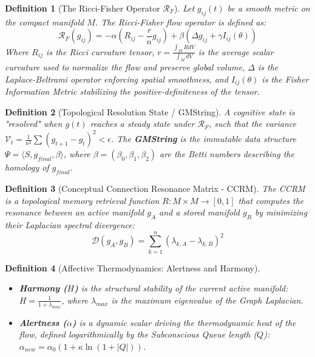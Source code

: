 \documentclass[11pt,a4paper,twocolumn]{article}
\newtheorem{definition}{Definition}[section]
\begin{document}
\begin{definition}[The Ricci-Fisher Operator $\mathcal{R}_F$]
Let $g_{ij}(t)$ be a smooth metric on the compact manifold $M$. The Ricci-Fisher flow operator is defined as:
\[ \mathcal{R}_F(g_{ij}) = -\alpha \left( R_{ij} - \frac{r}{n} g_{ij} \right) + \beta \left( \Delta g_{ij} + \gamma I_{ij}(\theta) \right) \]
Where $R_{ij}$ is the Ricci curvature tensor, $r = \frac{\int_M R dV}{\int_M dV}$ is the average scalar curvature used to normalize the flow and preserve global volume, $\Delta$ is the Laplace-Beltrami operator enforcing spatial smoothness, and $I_{ij}(\theta)$ is the Fisher Information Metric stabilizing the positive-definiteness of the tensor.
\end{definition}

\begin{definition}[Topological Resolution State / GMString]
A cognitive state is "resolved" when $g(t)$ reaches a steady state under $\mathcal{R}_F$, such that the variance $\mathcal{V}_t = \frac{1}{n^2} \sum (g_{t+1} - g_t)^2 < \epsilon$. The \textbf{GMString} is the immutable data structure $\Psi = \langle S, g_{final}, \beta \rangle$, where $\beta = (\beta_0, \beta_1, \beta_2)$ are the Betti numbers describing the homology of $g_{final}$.
\end{definition}

\begin{definition}[Conceptual Connection Resonance Matrix - CCRM]
The CCRM is a topological memory retrieval function $R: M \times M \to [0,1]$ that computes the resonance between an active manifold $g_A$ and a stored manifold $g_B$ by minimizing their Laplacian spectral divergence:
\[ \mathcal{D}(g_A, g_B) = \sum_{k=1}^n (\lambda_{k, A} - \lambda_{k, B})^2 \]
\end{definition}

\begin{definition}[Affective Thermodynamics: Alertness and Harmony]
\begin{itemize}[noitemsep]
    \item \textbf{Harmony ($H$)} is the structural stability of the current active manifold: $H = \frac{1}{1 + \lambda_{max}}$, where $\lambda_{max}$ is the maximum eigenvalue of the Graph Laplacian.
    \item \textbf{Alertness ($\alpha$)} is a dynamic scalar driving the thermodynamic heat of the flow, defined logarithmically by the Subconscious Queue length ($Q$): $\alpha_{new} = \alpha_0 (1 + \kappa \ln(1 + |Q|))$.
\end{itemize}
\end{definition}
\end{document}
